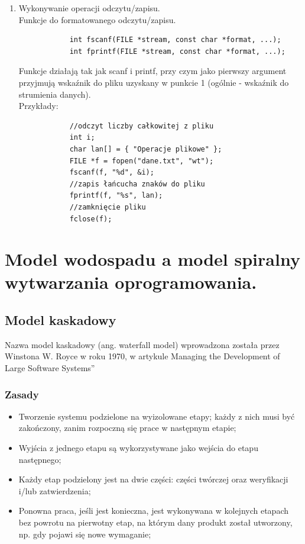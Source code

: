 \documentclass[12pt]{article}
\begin{document}
\begin{enumerate}
        \item
        Wykonywanie operacji odczytu/zapisu.\\
        Funkcje do formatowanego odczytu/zapisu.
        \begin{verbatim}
            int fscanf(FILE *stream, const char *format, ...);
            int fprintf(FILE *stream, const char *format, ...);
        \end{verbatim}
        Funkcje działają tak jak scanf i printf, przy czym jako pierwszy argument przyjmują
        wskaźnik do pliku uzyskany w punkcie 1 (ogólnie - wskaźnik do strumienia danych).\\
        Przykłady:
        \begin{verbatim}
            //odczyt liczby całkowitej z pliku
            int i;
            char lan[] = { "Operacje plikowe" };
            FILE *f = fopen("dane.txt", "wt");
            fscanf(f, "%d", &i);
            //zapis łańcucha znaków do pliku
            fprintf(f, "%s", lan);
            //zamknięcie pliku
            fclose(f);
        \end{verbatim}

    \end{enumerate}

    \newpage

    \section{Model wodospadu a model spiralny wytwarzania oprogramowania.}

    \subsection{Model kaskadowy}
    Nazwa model kaskadowy (ang. waterfall model) wprowadzona została przez Winstona W. Royce w roku 1970, w artykule Managing the Development of Large Software Systems”

    \subsubsection{Zasady}
    \begin{itemize}
        \item Tworzenie systemu podzielone na wyizolowane
        etapy; każdy z nich musi być zakończony, zanim
        rozpoczną się prace w następnym etapie;
        \item Wyjścia z jednego etapu są wykorzystywane jako
        wejścia do etapu następnego;
        \item Każdy etap podzielony jest na dwie części: części
        twórczej oraz weryfikacji i/lub zatwierdzenia;
        \item Ponowna praca, jeśli jest konieczna, jest
        wykonywana w kolejnych etapach bez powrotu na
        pierwotny etap, na którym dany produkt został
        utworzony, np. gdy pojawi się nowe wymaganie;
    \end{itemize}
\end{document}
